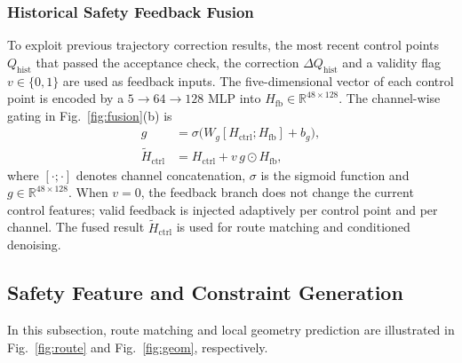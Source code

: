 \documentclass[journal]{IEEEtran}
\newcommand{\R}{\mathbb{R}}
\begin{document}
\subsubsection{Historical Safety Feedback Fusion}

To exploit previous trajectory correction results, the most recent control points $Q_{\mathrm{hist}}$ that passed the acceptance check, the correction $\Delta Q_{\mathrm{hist}}$ and a validity flag $v\in\{0,1\}$ are used as feedback inputs. The five-dimensional vector of each control point is encoded by a $5\!\rightarrow\!64\!\rightarrow\!128$ MLP into $H_{\mathrm{fb}}\in\R^{48\times128}$. The channel-wise gating in Fig.~\ref{fig:fusion}(b) is
\begin{equation}
\begin{aligned}
g&=\sigma\bigl(W_g[H_{\mathrm{ctrl}};H_{\mathrm{fb}}]+b_g\bigr),\\
\widetilde H_{\mathrm{ctrl}}
&=H_{\mathrm{ctrl}}+v\,g\odot H_{\mathrm{fb}},
\end{aligned}
\end{equation}
where $[\cdot;\cdot]$ denotes channel concatenation, $\sigma$ is the sigmoid function and $g\in\R^{48\times128}$. When $v=0$, the feedback branch does not change the current control features; valid feedback is injected adaptively per control point and per channel. The fused result $\widetilde H_{\mathrm{ctrl}}$ is used for route matching and conditioned denoising.

\subsection{Safety Feature and Constraint Generation}

In this subsection, route matching and local geometry prediction are illustrated in Fig.~\ref{fig:route} and Fig.~\ref{fig:geom}, respectively.


\end{document}
